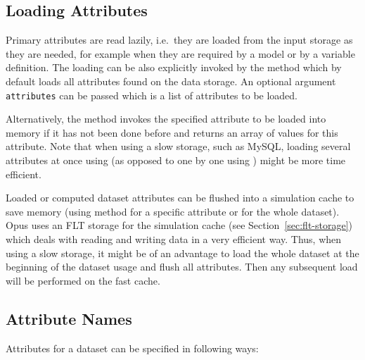 %
\subsection{Loading Attributes}
%
Primary attributes \primaryattributesindex are read lazily, i.e.\ they are loaded from the input
storage as they are needed, for example when they are required by a model or
by a variable definition. The loading can be also explicitly invoked by the
method  \datasetindex which by default loads all attributes \attributesindex found on
the data storage. An optional argument \verb|attributes| \attributesindex can be passed which
is a list of attributes \attributesindex to be loaded.

Alternatively, the method  \attributesindex invokes the specified
attribute \attributesindex to be loaded into memory if it has not been done before and returns
an array of values for this attribute. \attributesindex Note that when using a slow storage,
such as MySQL, loading several attributes \attributesindex at once using  \datasetindex
(as opposed to one by one using ) \attributesindex might be more
time efficient. 

Loaded or computed dataset \datasetindex attributes \attributesindex can be flushed into a simulation cache to
save memory  (using method
 \attributesindex for a specific attribute \attributesindex or
 for the whole dataset). \datasetindex Opus uses an FLT storage for
the simulation cache (see Section~\ref{sec:flt-storage}) which deals with
reading and writing data in a very efficient way. Thus, when using a slow
storage, it might be of an advantage to load the whole dataset \datasetindex at the beginning
of the dataset \datasetindex usage and flush all attributes. \attributesindex Then any subsequent load will be
performed on the fast cache.

\subsection{Attribute Names}
\label{sec:opus-core-attribute-names}
%
Attributes \attributesindex for a dataset \datasetindex can be specified in following ways:

